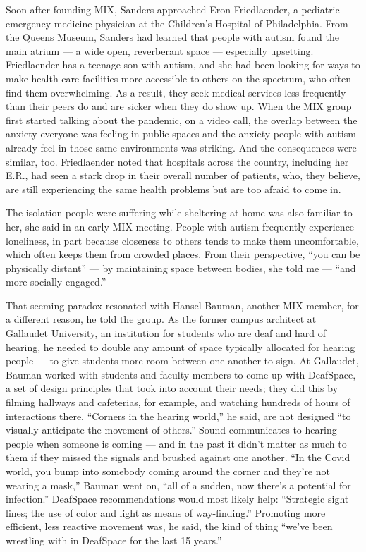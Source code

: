 Soon after founding MIX, Sanders approached Eron Friedlaender, a
pediatric emergency-medicine physician at the Children's Hospital of
Philadelphia. From the Queens Museum, Sanders had learned that people
with autism found the main atrium --- a wide open, reverberant space ---
especially upsetting. Friedlaender has a teenage son with autism, and
she had been looking for ways to make health care facilities more
accessible to others on the spectrum, who often find them overwhelming.
As a result, they seek medical services less frequently than their peers
do and are sicker when they do show up. When the MIX group first started
talking about the pandemic, on a video call, the overlap between the
anxiety everyone was feeling in public spaces and the anxiety people
with autism already feel in those same environments was striking. And
the consequences were similar, too. Friedlaender noted that hospitals
across the country, including her E.R., had seen a stark drop in their
overall number of patients, who, they believe, are still experiencing
the same health problems but are too afraid to come in.

The isolation people were suffering while sheltering at home was also
familiar to her, she said in an early MIX meeting. People with autism
frequently experience loneliness, in part because closeness to others
tends to make them uncomfortable, which often keeps them from crowded
places. From their perspective, ``you can be physically distant'' --- by
maintaining space between bodies, she told me --- ``and more socially
engaged.''

That seeming paradox resonated with Hansel Bauman, another MIX member,
for a different reason, he told the group. As the former campus
architect at Gallaudet University, an institution for students who are
deaf and hard of hearing, he needed to double any amount of space
typically allocated for hearing people --- to give students more room
between one another to sign. At Gallaudet, Bauman worked with students
and faculty members to come up with DeafSpace, a set of design
principles that took into account their needs; they did this by filming
hallways and cafeterias, for example, and watching hundreds of hours of
interactions there. ``Corners in the hearing world,'' he said, are not
designed ``to visually anticipate the movement of others.'' Sound
communicates to hearing people when someone is coming --- and in the
past it didn't matter as much to them if they missed the signals and
brushed against one another. ``In the Covid world, you bump into
somebody coming around the corner and they're not wearing a mask,''
Bauman went on, ``all of a sudden, now there's a potential for
infection.'' DeafSpace recommendations would most likely help:
``Strategic sight lines; the use of color and light as means of
way-finding.'' Promoting more efficient, less reactive movement was, he
said, the kind of thing ``we've been wrestling with in DeafSpace for the
last 15 years.''

